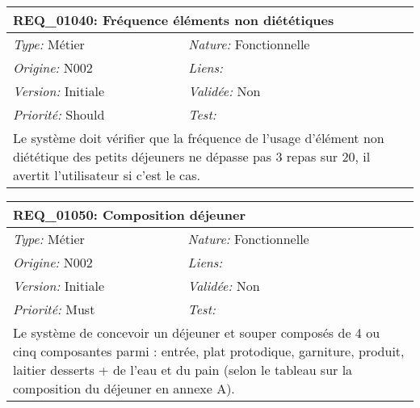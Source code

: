 \begin{table}[!ht]

\begin{tabular}{|p{60mm}p{100mm}|}

\hline

\multicolumn{2}{|l|}{\textbf{REQ\_01040:} Fréquence éléments non diététiques} \\ \hline

\emph{Type:} Métier & \emph{Nature:} Fonctionnelle \\

\emph{Origine:} N002 & \emph{Liens:}  \\

\emph{Version:} Initiale & \emph{Validée:} Non \\

\emph{Priorité:} Should & \emph{Test:} \\ \hline

\multicolumn{2}{|p{16cm}|}{Le système doit vérifier que la fréquence de l'usage d'élément non diététique des petits déjeuners ne dépasse pas 3 repas sur 20, il avertit l'utilisateur si c'est le cas.} \\ \hline

\end{tabular}

\end{table}



\begin{table}[!ht]

\begin{tabular}{|p{60mm}p{100mm}|}

\hline

\multicolumn{2}{|l|}{\textbf{REQ\_01050:} Composition déjeuner} \\ \hline

\emph{Type:} Métier & \emph{Nature:} Fonctionnelle \\

\emph{Origine:} N002 & \emph{Liens:}  \\

\emph{Version:} Initiale & \emph{Validée:} Non \\

\emph{Priorité:} Must & \emph{Test:} \\ \hline

\multicolumn{2}{|p{16cm}|}{Le système de concevoir un déjeuner et souper composés de 4 ou cinq composantes parmi : entrée, plat protodique, garniture, produit, laitier desserts + de l'eau et du pain (selon le tableau sur la composition du déjeuner en annexe A).} \\ \hline

\end{tabular}

\end{table}



